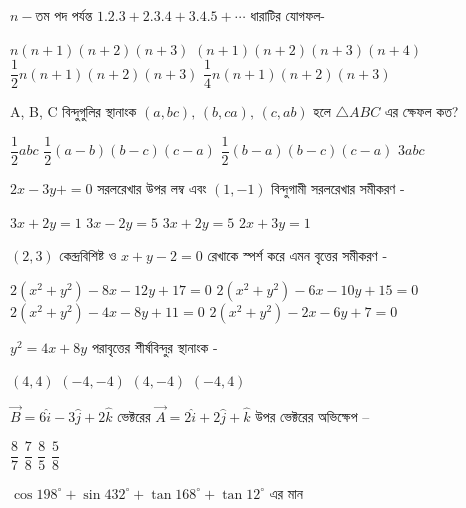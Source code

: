 \documentclass[addpoints]{exam}
\begin{document}
\begin{questions}
\begin{oneparchoices}
\end{oneparchoices}

\question  $ n- $তম পদ পর্যন্ত $ 1.2.3+2.3.4+3.4.5+\cdots $ ধারাটির যোগফল-

\begin{oneparchoices}
\choice $ n(n+1)(n+2)(n+3) $
\choice $ (n+1)(n+2)(n+3)(n+4) $
\choice $ \dfrac{1}{2} n(n+1)(n+2)(n+3) $
\choice $ \dfrac{1}{4} n(n+1)(n+2)(n+3) $
\end{oneparchoices}

\question  A, B, C বিন্দুগুলির স্থানাংক $ (a, bc),\,(b,ca),\,(c,ab) $ হলে $ \triangle ABC $ এর ক্ষেফল কত?

\begin{oneparchoices}
\choice $ \dfrac{1}{2}abc $
\choice $ \dfrac{1}{2}(a-b)(b-c)(c-a) $
\choice $ \dfrac{1}{2}(b-a)(b-c)(c-a) $
\choice $ 3abc $
\end{oneparchoices}

 \question  $ 2x-3y+=0 $ সরলরেখার উপর লম্ব এবং $ (1,-1) $ বিন্দুগামী সরলরেখার সমীকরণ -

\begin{oneparchoices}
\choice $ 3x+2y=1 $
\choice $ 3x-2y=5 $
\choice $ 3x+2y=5 $
\choice $ 2x+3y = 1 $
\end{oneparchoices}

\question  $ (2,3) $ কেন্দ্রবিশিষ্ট ও $ x+y-2=0 $ রেখাকে স্পর্শ করে এমন বৃত্তের সমীকরণ -

\begin{oneparchoices}
\choice  $ 2(x^{2}+y^{2})-8x-12y+17=0 $
\choice  $ 2(x^{2}+y^{2})-6x-10y+15=0 $\\
\choice  $ 2(x^{2}+y^{2})-4x-8y+11=0 $
\choice  $ 2(x^{2}+y^{2})-2x-6y+7=0 $
\end{oneparchoices}

\question $ y^{2}=4x+8y $ পরাবৃত্তের শীর্ষবিন্দুর স্থানাংক -

\begin{oneparchoices}
\choice $ (4,4) $
\choice $ (-4,-4) $
\choice $ (4,-4) $
\choice  $ (-4,4) $
\end{oneparchoices}

\question $ \vec{B} = 6\hat{i}-3\hat{j}+2\hat{k} $ ভেক্টরের  $ \vec{A} =2\hat{i}+2\hat{j}+\hat{k} $ উপর ভেক্টরের অভিক্ষেপ –

\begin{oneparchoices}
\choice $ \dfrac{8}{7} $
\choice $ \dfrac{7}{8} $
\choice $ \dfrac{8}{5} $
\choice  $\dfrac{5}{8} $
\end{oneparchoices}

\question $ \cos 198^{\circ} +\sin 432^{\circ} + \tan 168^{\circ} + \tan 12^{\circ}$ এর মান


\end{questions}
\end{document}
